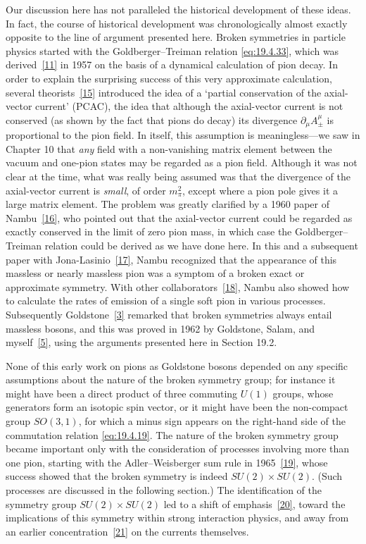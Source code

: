 Our discussion here has not paralleled the historical development of these ideas. In fact, the course of historical development was chronologically almost exactly opposite to the line of argument presented here. Broken symmetries in particle physics started with the Goldberger--Treiman relation \eqref{eq:19.4.33}, which was derived~\hyperref[ch19-ref-11]{[11]} in 1957 on the basis of a dynamical calculation of pion decay. In order to explain the surprising success of this very approximate calculation, several theorists~\hyperref[ch19-ref-15]{[15]} introduced the idea of a `partial conservation of the axial-vector current' (PCAC), the idea that although the axial-vector current is not conserved (as shown by the fact that pions do decay) its divergence $\partial_\mu A_\pm^\mu$ is proportional to the pion field. In itself, this assumption is meaningless---we saw in Chapter 10 that \emph{any} field with a non-vanishing matrix element between the vacuum and one-pion states may be regarded as a pion field. Although it was not clear at the time, what was really being assumed was that the divergence of the axial-vector current is \emph{small}, of order $m_\pi^2$, except where a pion pole gives it a large matrix element. The problem was greatly clarified by a 1960 paper of Nambu~\hyperref[ch19-ref-16]{[16]}, who pointed out that the axial-vector current could be regarded as exactly conserved in the limit of zero pion mass, in which case the Goldberger--Treiman relation could be derived as we have done here. In this and a subsequent paper with Jona-Lasinio~\hyperref[ch19-ref-17]{[17]}, Nambu recognized that the appearance of this massless or nearly massless pion was a symptom of a broken exact or approximate symmetry. With other collaborators~\hyperref[ch19-ref-18]{[18]}, Nambu also showed how to calculate the rates of emission of a single soft pion in various processes. Subsequently Goldstone~\hyperref[ch19-ref-3]{[3]} remarked that broken symmetries always entail massless bosons, and this was proved in 1962 by Goldstone, Salam, and myself~\hyperref[ch19-ref-5]{[5]}, using the arguments presented here in Section 19.2.

None of this early work on pions as Goldstone bosons depended on any specific assumptions about the nature of the broken symmetry group; for instance it might have been a direct product of three commuting $U(1)$ groups, whose generators form an isotopic spin vector, or it might have been the non-compact group $SO(3,1)$, for which a minus sign appears on the right-hand side of the commutation relation \eqref{eq:19.4.19}. The nature of the broken symmetry group became important only with the consideration of processes involving more than one pion, starting with the Adler--Weisberger sum rule in 1965~\hyperref[ch19-ref-19]{[19]}, whose success showed that the broken symmetry is indeed $SU(2)\times SU(2)$. (Such processes are discussed in the following section.) The identification of the symmetry group $SU(2)\times SU(2)$ led to a shift of emphasis~\hyperref[ch19-ref-20]{[20]}, toward the implications of this symmetry within strong interaction physics, and away from an earlier concentration~\hyperref[ch19-ref-21]{[21]} on the currents themselves.

